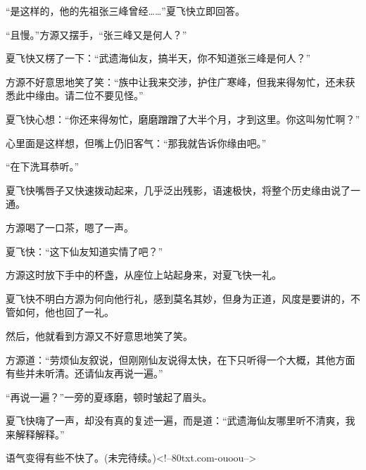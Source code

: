 \begin{this_body}
“是这样的，他的先祖张三峰曾经……”夏飞快立即回答。

“且慢。”方源又摆手，“张三峰又是何人？”

夏飞快又楞了一下：“武遗海仙友，搞半天，你不知道张三峰是何人？”

方源不好意思地笑了笑：“族中让我来交涉，护住广寒峰，但我来得匆忙，还未获悉此中缘由。请二位不要见怪。”

夏飞快心想：“你还来得匆忙，磨磨蹭蹭了大半个月，才到这里。你这叫匆忙啊？”

心里面是这样想，但嘴上仍旧客气：“那我就告诉你缘由吧。”

“在下洗耳恭听。”

夏飞快嘴唇子又快速拨动起来，几乎泛出残影，语速极快，将整个历史缘由说了一通。

方源喝了一口茶，嗯了一声。

夏飞快：“这下仙友知道实情了吧？”

方源这时放下手中的杯盏，从座位上站起身来，对夏飞快一礼。

夏飞快不明白方源为何向他行礼，感到莫名其妙，但身为正道，风度是要讲的，不管如何，他也回了一礼。

然后，他就看到方源又不好意思地笑了笑。

方源道：“劳烦仙友叙说，但刚刚仙友说得太快，在下只听得一个大概，其他方面有些并未听清。还请仙友再说一遍。”

“再说一遍？”一旁的夏琢磨，顿时皱起了眉头。

夏飞快嗨了一声，却没有真的复述一遍，而是道：“武遗海仙友哪里听不清爽，我来解释解释。”

语气变得有些不快了。(未完待续。)<!--80txt.com-ouoou-->

\end{this_body}

